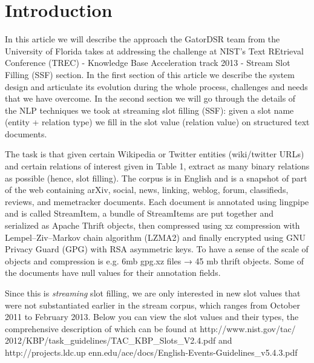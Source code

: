 
\section{Introduction}

In this article we will describe the approach the GatorDSR team from the University of Florida takes at addressing the challenge at NIST’s Text REtrieval Conference (TREC) - Knowledge Base Acceleration track 2013 - Stream Slot Filling (SSF) section. In the first section of this article we describe the system design and articulate its evolution during the whole process, challenges and needs that we have overcome. In the second section we will go through the details of the NLP techniques we took at streaming slot filling (SSF): given a slot name (entity + relation type) we fill in the slot value (relation value) on structured text documents.

The task is that given certain Wikipedia or Twitter entities (wiki/twitter URLs) and certain relations of interest given in Table 1, extract as many binary relations as possible (hence, slot filling). The corpus is in English and is a snapshot of part of the web containing arXiv, social, news, linking, weblog, forum, classifieds, reviews, and memetracker documents. Each document is annotated using lingpipe and is called StreamItem, a bundle of StreamItems are put together and serialized as Apache Thrift objects, then compressed using xz compression with Lempel–Ziv–Markov chain algorithm (LZMA2) and finally encrypted using GNU Privacy Guard (GPG) with RSA asymmetric keys. To have a sense of the scale of objects and compression is e.g. 6mb gpg.xz files → 45 mb thrift objects. Some of the documents have null values for their annotation fields.

Since this is \textit{streaming} slot filling, we are only interested in new slot values that were not substantiated earlier in the stream corpus, which ranges from October 2011 to February 2013. Below you can view the slot values and their types, the comprehensive description of which can be found at http://www.nist.gov/tac/
2012/KBP/task\_guidelines/TAC\_KBP\_Slots\_V2.4.pdf and http://projects.ldc.up
enn.edu/ace/docs/English-Events-Guidelines\_v5.4.3.pdf 

